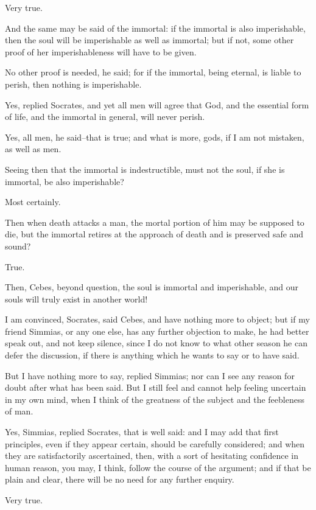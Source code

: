 Very true.

And the same may be said of the immortal: if the immortal is also
imperishable, then the soul will be imperishable as well as immortal;
but if not, some other proof of her imperishableness will have to be
given.

No other proof is needed, he said; for if the immortal, being eternal,
is liable to perish, then nothing is imperishable.

Yes, replied Socrates, and yet all men will agree that God, and the
essential form of life, and the immortal in general, will never perish.

Yes, all men, he said--that is true; and what is more, gods, if I am not
mistaken, as well as men.

Seeing then that the immortal is indestructible, must not the soul, if
she is immortal, be also imperishable?

Most certainly.

Then when death attacks a man, the mortal portion of him may be supposed
to die, but the immortal retires at the approach of death and is
preserved safe and sound?

True.

Then, Cebes, beyond question, the soul is immortal and imperishable, and
our souls will truly exist in another world!

I am convinced, Socrates, said Cebes, and have nothing more to object;
but if my friend Simmias, or any one else, has any further objection to
make, he had better speak out, and not keep silence, since I do not know
to what other season he can defer the discussion, if there is anything
which he wants to say or to have said.

But I have nothing more to say, replied Simmias; nor can I see any
reason for doubt after what has been said. But I still feel and cannot
help feeling uncertain in my own mind, when I think of the greatness of
the subject and the feebleness of man.

Yes, Simmias, replied Socrates, that is well said: and I may add that
first principles, even if they appear certain, should be carefully
considered; and when they are satisfactorily ascertained, then, with a
sort of hesitating confidence in human reason, you may, I think, follow
the course of the argument; and if that be plain and clear, there will
be no need for any further enquiry.

Very true.


